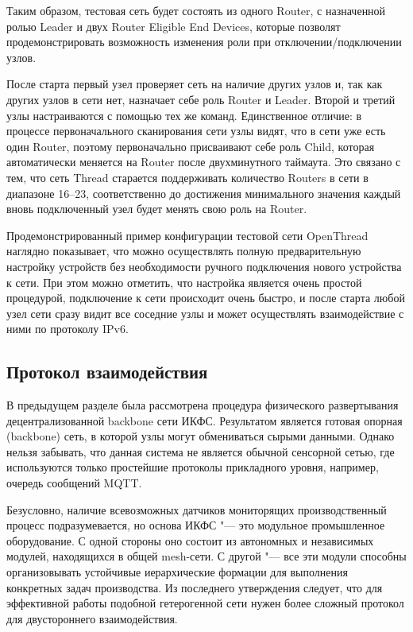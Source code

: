 Таким образом, тестовая сеть будет состоять из одного Router, с назначенной ролью Leader и двух Router Eligible End Devices, которые позволят продемонстрировать возможность изменения роли при отключении/подключении узлов.

После старта первый узел проверяет сеть на наличие других узлов и, так как других узлов в сети нет, назначает себе роль Router и Leader. Второй и третий узлы настраиваются с помощью тех же команд. Единственное отличие: в процессе первоначального сканирования сети узлы видят, что в сети уже есть один Router, поэтому первоначально присваивают себе роль Child, которая автоматически меняется на Router после двухминутного таймаута. Это связано с тем, что сеть Thread старается поддерживать количество Routers в сети в диапазоне 16--23, соответственно до достижения минимального значения каждый вновь подключенный узел будет менять свою роль на Router.

Продемонстрированный пример конфигурации тестовой сети OpenThread наглядно показывает, что можно осуществлять полную предварительную настройку устройств без необходимости ручного подключения нового устройства к сети. При этом можно отметить, что настройка является очень простой процедурой, подключение к сети происходит очень быстро, и после старта любой узел сети сразу видит все соседние узлы и может осуществлять взаимодействие с ними по протоколу IPv6.

\subsection{Протокол взаимодействия}

В предыдущем разделе была рассмотрена процедура физического развертывания децентрализованной backbone сети ИКФС. Результатом является готовая опорная  (backbone) сеть, в которой узлы могут обмениваться сырыми данными. Однако нельзя забывать, что данная система не является обычной сенсорной сетью, где используются только простейшие протоколы прикладного уровня, например, очередь сообщений MQTT.

Безусловно, наличие всевозможных датчиков мониторящих производственный процесс подразумевается, но основа ИКФС "--- это модульное промышленное оборудование. С одной стороны оно состоит из автономных и независимых модулей, находящихся в общей mesh-сети. С другой "--- все эти модули способны организовывать устойчивые иерархические формации для выполнения конкретных задач производства. Из последнего утверждения следует, что для эффективной работы подобной гетерогенной сети нужен более сложный протокол для двустороннего взаимодействия.

